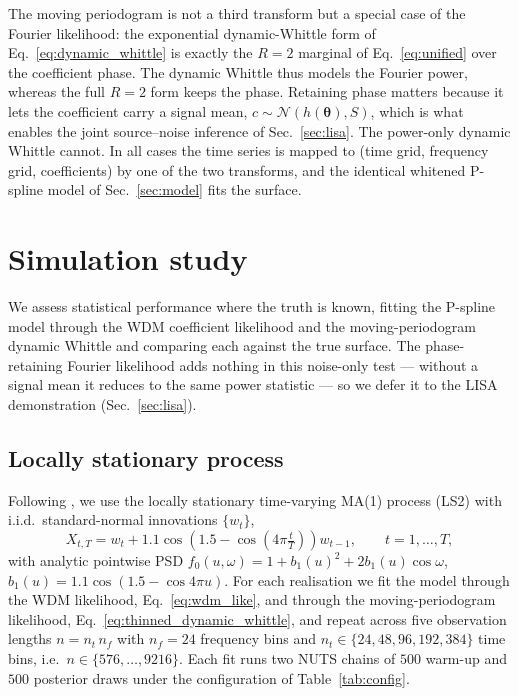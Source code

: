 \documentclass[
  aps,
  prd,
  twocolumn,
  amsmath,
  amssymb,
  nofootinbib,
  superscriptaddress,
  longbibliography,
]{revtex4-2}
\begin{document}
The moving periodogram is not a third transform but a special case of the
Fourier likelihood: the exponential dynamic-Whittle form of
Eq.~\eqref{eq:dynamic_whittle} is exactly the $R=2$ marginal of
Eq.~\eqref{eq:unified} over the coefficient phase. The dynamic Whittle thus
models the Fourier power, whereas the full $R=2$ form keeps the phase. Retaining
phase matters because it lets the coefficient carry a signal mean,
$c\sim\mathcal{N}(h(\bm\theta), S)$, which is what enables the joint
source--noise inference of Sec.~\ref{sec:lisa}. The power-only dynamic Whittle
cannot. In all cases the time series is mapped to (time grid, frequency grid,
coefficients) by one of the two transforms, and the identical whitened P-spline
model of Sec.~\ref{sec:model} fits the surface.

\section{Simulation study}
\label{sec:sim}

We assess statistical performance where the truth is known, fitting the P-spline
model through the WDM coefficient likelihood and the moving-periodogram dynamic
Whittle and comparing each against the true surface. The phase-retaining Fourier
likelihood adds nothing in this noise-only test --- without a signal mean it
reduces to the same power statistic --- so we defer it to the LISA demonstration
(Sec.~\ref{sec:lisa}).

\subsection{Locally stationary process}
Following \citet{tang2023MovingPSD}, we use the locally stationary time-varying
MA(1) process (LS2) with i.i.d.\ standard-normal innovations $\{w_t\}$,
\begin{equation}
X_{t,T} = w_t + 1.1\cos\!\left(1.5 - \cos\!\left(4\pi\tfrac{t}{T}\right)\right) w_{t-1},
\qquad t=1,\ldots,T,
\label{eq:ls2}
\end{equation}
with analytic pointwise PSD $f_0(u,\omega) = 1 + b_1(u)^2 + 2b_1(u)\cos\omega$,
$b_1(u) = 1.1\cos(1.5 - \cos 4\pi u)$. For each realisation we fit the model
through the WDM likelihood, Eq.~\eqref{eq:wdm_like}, and through the
moving-periodogram likelihood, Eq.~\eqref{eq:thinned_dynamic_whittle}, and repeat
across five observation lengths $n = n_t\,n_f$ with $n_f = 24$ frequency bins and
$n_t \in \{24, 48, 96, 192, 384\}$ time bins, i.e.\ $n \in \{576, \ldots, 9216\}$.
Each fit runs two NUTS chains of $500$ warm-up and $500$ posterior draws
under the configuration of Table~\ref{tab:config}.
\end{document}
